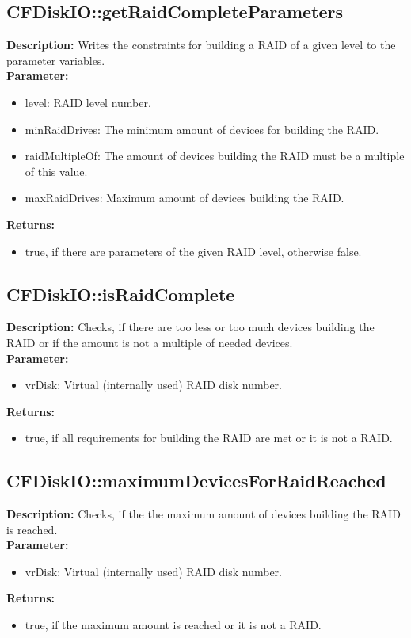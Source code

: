 \subsection{CFDiskIO::getRaidCompleteParameters}
\textbf{Description:} Writes the constraints for building a RAID of a given level to the parameter variables.\\
\textbf{Parameter:}
\begin{itemize}
\item level: RAID level number.
\item minRaidDrives: The minimum amount of devices for building the RAID.
\item raidMultipleOf: The amount of devices building the RAID must be a multiple of this value.
\item maxRaidDrives: Maximum amount of devices building the RAID.
\end{itemize}
\textbf{Returns:}
\begin{itemize}
\item true, if there are parameters of the given RAID level, otherwise false.
\end{itemize}

\subsection{CFDiskIO::isRaidComplete}
\textbf{Description:} Checks, if there are too less or too much devices building the RAID or if the amount is not a multiple of needed devices.\\
\textbf{Parameter:}
\begin{itemize}
\item vrDisk: Virtual (internally used) RAID disk number.
\end{itemize}
\textbf{Returns:}
\begin{itemize}
\item true, if all requirements for building the RAID are met or it is not a RAID.
\end{itemize}

\subsection{CFDiskIO::maximumDevicesForRaidReached}
\textbf{Description:} Checks, if the the maximum amount of devices building the RAID is reached.\\
\textbf{Parameter:}
\begin{itemize}
\item vrDisk: Virtual (internally used) RAID disk number.
\end{itemize}
\textbf{Returns:}
\begin{itemize}
\item true, if the maximum amount is reached or it is not a RAID.
\end{itemize}

